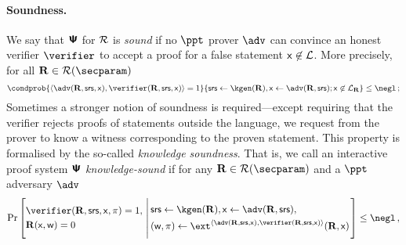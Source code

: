 \documentclass[runningheads,11pt]{llncs}
\begin{document}
\paragraph{Soundness.}
    We say that $\bm{\mathsf{\Psi}}$ for $\mathcal{R}$ is \emph{sound} if no
  $\ppt$ prover $\adv$ can convince an honest verifier $\verifier$ to accept a
  proof for a false statement $\mathsf{x} \not\in\mathcal{L}$. More precisely, for
  all $\REL \in \RELGEN(\secparam)$
	\[
      \condprob{\ip{\adv(\REL, \srs, \inp)}{\verifier(\REL, \srs, \inp)} =
        1}{\srs \gets \kgen(\REL), \inp \gets \adv(\REL, \srs); \inp \not\in
        \LANG_\REL} \leq \negl\,;
	\]
Sometimes a stronger notion of soundness is required---except requiring that the
verifier rejects proofs of statements outside the language, we request from the
prover to know a witness corresponding to the proven statement. This property is
formalised by the so-called \emph{knowledge soundness}.
That is, we call an interactive proof system $\bm{\mathsf{\Psi}}$
\emph{knowledge-sound} if for any $\REL \in \RELGEN(\secparam)$ and a $\ppt$
adversary $\adv$
	\[
	\Pr\left[
		\begin{aligned}
			& \verifier(\REL, \srs, \inp, \zkproof) = 1, \\
			& \REL(\inp, \wit) = 0
	 \end{aligned}
	  \,\left|\,
	 \begin{aligned}
		 & \srs \gets \kgen(\REL), \inp \gets \adv(\REL, \srs), \\
		 & (\wit, \zkproof) \gets \ext^{\ip{\adv(\REL, \srs, \inp)}{\verifier(\REL, \srs, \inp)}}(\REL, \inp)
	 \end{aligned}
	 \vphantom{\begin{aligned}
		 \adv (\zkproof) = 1, \\
		 \text{if $\zkproof{}$ is accepting} \\
		 \pcind \text{then $\REL(\inp, \wit)$}
	 \end{aligned}}\right.
	 \right] \leq \negl\,,
 \]

\end{document}
